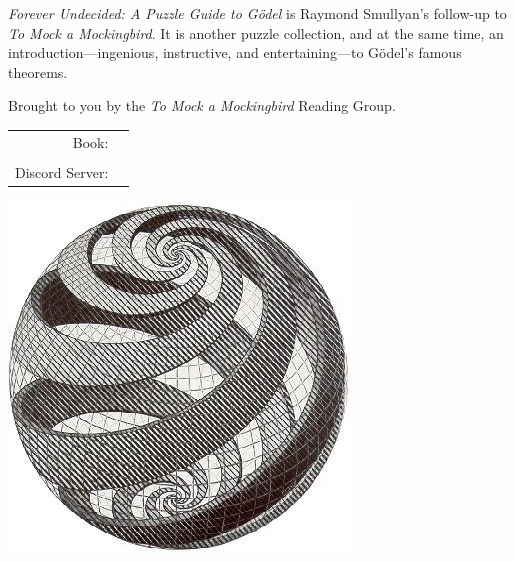 \documentclass[letterpaper]{article}
\begin{document}


\emph{Forever Undecided: A Puzzle Guide to Gödel} is Raymond Smullyan's follow-up to \emph{To Mock a Mockingbird}.  It is another puzzle collection, and at the same time, an introduction---ingenious, instructive, and entertaining---to Gödel’s famous theorems.

\vspace{1em} \noindent Brought to you by the \emph{To Mock a Mockingbird} Reading Group.

\vspace{0.75in}

\begin{tabular}{rl}
    \csctimefont Book: &   \\
    & \\
    \csctimefont Discord Server: & 
\end{tabular}

\vspace{0.75in}
\begin{center}
\includegraphics[scale = 0.75]{escher_spiral_ball.jpg}
\end{center}
\end{document}
